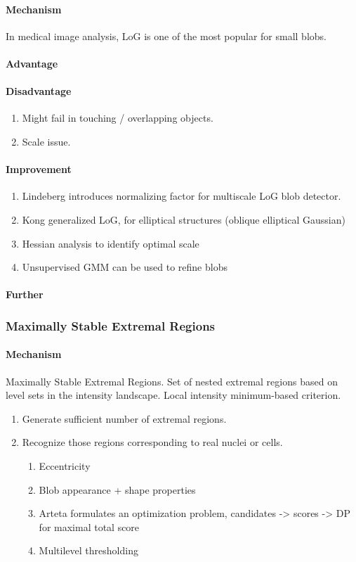 \documentclass[10pt,a4paper]{article}
\begin{document}
\paragraph{Mechanism}
In medical image analysis, LoG is one of the most popular for small blobs.
\paragraph{Advantage}
\paragraph{Disadvantage}
\begin{enumerate}
	\item Might fail in touching / overlapping objects. 
	\item Scale issue.
\end{enumerate}
\paragraph{Improvement}
\begin{enumerate}
	\item Lindeberg introduces normalizing factor for multiscale LoG blob detector.
	\item Kong generalized LoG, for elliptical structures (oblique elliptical Gaussian)
	\item Hessian analysis to identify optimal scale
	\item Unsupervised GMM can be used to refine blobs
	
\end{enumerate}
\paragraph{Further}

\subsubsection{Maximally Stable Extremal Regions}
\paragraph{Mechanism}
Maximally Stable Extremal Regions. Set of nested extremal regions based on level sets in the intensity landscape. Local intensity minimum-based criterion.
\begin{enumerate}
	\item Generate sufficient number of extremal regions.
	\item Recognize those regions corresponding to real nuclei or cells.
	\begin{enumerate}
		\item Eccentricity
		\item Blob appearance + shape properties
		\item Arteta formulates an optimization problem, candidates -> scores -> DP for maximal total score
		\item Multilevel thresholding
	\end{enumerate}
\end{enumerate}
\end{document}
